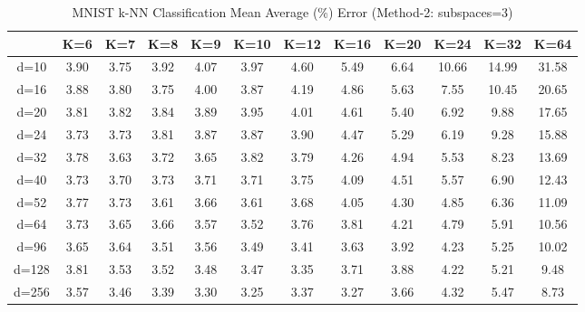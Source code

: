 \begin{table}[H]
\centering
\label{tab:table2}
\begin{tabular}{|c|c|c|c|c|c|c|c|c|c|c|c|}
\hline
& K=6 & K=7 & K=8 & K=9 & K=10 & K=12 & K=16 & K=20 & K=24 & K=32 & K=64 \\
\hline
d=10 & 3.90 & 3.75 & 3.92 & 4.07 & 3.97 & 4.60 & 5.49 & 6.64 & 10.66 & 14.99 & 31.58 \\
d=16 & 3.88 & 3.80 & 3.75 & 4.00 & 3.87 & 4.19 & 4.86 & 5.63 & 7.55 & 10.45 & 20.65 \\
d=20 & 3.81 & 3.82 & 3.84 & 3.89 & 3.95 & 4.01 & 4.61 & 5.40 & 6.92 & 9.88 & 17.65 \\
d=24 & 3.73 & 3.73 & 3.81 & 3.87 & 3.87 & 3.90 & 4.47 & 5.29 & 6.19 & 9.28 & 15.88 \\
d=32 & 3.78 & 3.63 & 3.72 & 3.65 & 3.82 & 3.79 & 4.26 & 4.94 & 5.53 & 8.23 & 13.69 \\
d=40 & 3.73 & 3.70 & 3.73 & 3.71 & 3.71 & 3.75 & 4.09 & 4.51 & 5.57 & 6.90 & 12.43 \\
d=52 & 3.77 & 3.73 & 3.61 & 3.66 & 3.61 & 3.68 & 4.05 & 4.30 & 4.85 & 6.36 & 11.09 \\
d=64 & 3.73 & 3.65 & 3.66 & 3.57 & 3.52 & 3.76 & 3.81 & 4.21 & 4.79 & 5.91 & 10.56 \\
d=96 & 3.65 & 3.64 & 3.51 & 3.56 & 3.49 & 3.41 & 3.63 & 3.92 & 4.23 & 5.25 & 10.02 \\
d=128 & 3.81 & 3.53 & 3.52 & 3.48 & 3.47 & 3.35 & 3.71 & 3.88 & 4.22 & 5.21 & 9.48 \\
d=256 & 3.57 & 3.46 & 3.39 & 3.30 & 3.25 & 3.37 & 3.27 & 3.66 & 4.32 & 5.47 & 8.73 \\
\hline
\end{tabular}
\caption{MNIST k-NN Classification Mean Average (\%) Error (Method-2: subspaces=3)}
\end{table}

